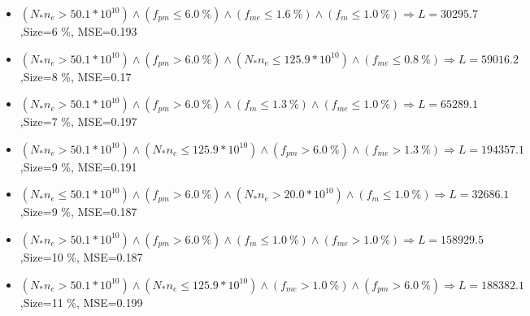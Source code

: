 \documentclass[numbered]{CSL}
\begin{document}
\begin{itemize}
\item $(N_* n_e > 50.1 * 10^{10}) \land (f_{pm} \leq 6.0~\%) \land (f_{me} \leq 1.6~\%) \land (f_m \leq 1.0~\%) \Rightarrow L = 30295.7$,\hfill Size=6 \%, MSE=0.193
\item $(N_* n_e > 50.1 * 10^{10}) \land (f_{pm} > 6.0~\%) \land (N_* n_e \leq 125.9 * 10^{10}) \land (f_{me} \leq 0.8~\%) \Rightarrow L = 59016.2$,\hfill Size=8 \%, MSE=0.17
\item $(N_* n_e > 50.1 * 10^{10}) \land (f_{pm} > 6.0~\%) \land (f_m \leq 1.3~\%) \land (f_{me} \leq 1.0~\%) \Rightarrow L = 65289.1$,\hfill Size=7 \%, MSE=0.197
\item $(N_* n_e > 50.1 * 10^{10}) \land (N_* n_e \leq 125.9 * 10^{10}) \land (f_{pm} > 6.0~\%) \land (f_{me} > 1.3~\%) \Rightarrow L = 194357.1$,\hfill Size=9 \%, MSE=0.191
\item $(N_* n_e \leq 50.1 * 10^{10}) \land (f_{pm} > 6.0~\%) \land (N_* n_e > 20.0 * 10^{10}) \land (f_m \leq 1.0~\%) \Rightarrow L = 32686.1$,\hfill Size=9 \%, MSE=0.187
\item $(N_* n_e > 50.1 * 10^{10}) \land (f_{pm} > 6.0~\%) \land (f_m \leq 1.0~\%) \land (f_{me} > 1.0~\%) \Rightarrow L = 158929.5$,\hfill Size=10 \%, MSE=0.187
\item $(N_* n_e > 50.1 * 10^{10}) \land (N_* n_e \leq 125.9 * 10^{10}) \land (f_{me} > 1.0~\%) \land (f_{pm} > 6.0~\%) \Rightarrow L = 188382.1$,\hfill Size=11 \%, MSE=0.199
\end{itemize}
\end{document}
